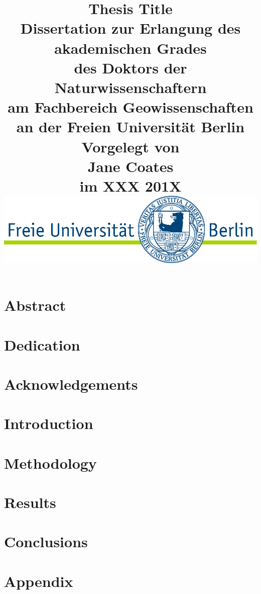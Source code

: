 \documentclass[12pt,twoside,openright,a4paper]{report}
\title{
    \textbf{{\large{Thesis Title}}}\\ \vspace{2cm}
    \normalsize{{Dissertation zur Erlangung des akademischen Grades} \\
    {des Doktors der Naturwissenschaftern} \\
    {am Fachbereich Geowissenschaften} \\
    {an der Freien Universit\"{a}t Berlin}\\} \vspace{2cm}
    \textbf{{Vorgelegt von} \\
    {Jane Coates} \\
    {im XXX 201X} \\} \vspace{3cm}
    {\includegraphics[scale=0.5]{img/FU_logo}}
}
\author{\vspace{-5ex}}
\date{\vspace{-5ex}}
\begin{document}
\maketitle
\clearpage{\pagestyle{empty}\cleardoublepage}


\clearpage{\pagestyle{empty}\cleardoublepage}


\chapter*{Abstract}
\clearpage{\pagestyle{empty}\cleardoublepage}
\chapter*{Dedication}
\clearpage{\pagestyle{empty}\cleardoublepage}
\chapter*{Acknowledgements}
\clearpage{\pagestyle{empty}\cleardoublepage}

\tableofcontents
\clearpage{\pagestyle{empty}\cleardoublepage}
\listoffigures
\clearpage{\pagestyle{empty}\cleardoublepage}
\listoftables
\clearpage{\pagestyle{empty}\cleardoublepage}

\chapter{Introduction} \label{s:introduction}
\clearpage{\pagestyle{empty}\cleardoublepage}

\chapter{Methodology} \label{s:methodology}
\clearpage{\pagestyle{empty}\cleardoublepage}

\chapter{Results} \label{s:results}
\clearpage{\pagestyle{empty}\cleardoublepage}

\chapter{Conclusions} \label{s:conclusions}
\clearpage{\pagestyle{empty}\cleardoublepage}

\chapter*{Appendix}
\clearpage{\pagestyle{empty}\cleardoublepage}


 
\end{document}
